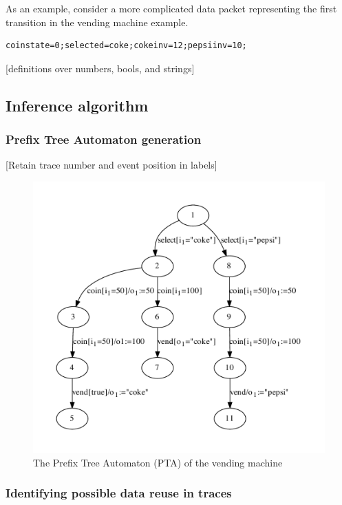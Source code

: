 As an example, consider a more complicated data packet representing the first transition in the vending machine example.

\begin{verbatim}
coinstate=0;selected=coke;cokeinv=12;pepsiinv=10;
\end{verbatim}

[definitions over numbers, bools, and strings]

\subsection{Inference algorithm}
\label{Algorithm}

\subsubsection{Prefix Tree Automaton generation}
\label{PTA}

[Retain trace number and event position in labels]

\begin{figure}[here]
\begin{center}
\includegraphics[width=12cm]{vend1.pdf}
\caption{The Prefix Tree Automaton (PTA) of the vending machine}
\label{fig:pta}
\end{center}
\end{figure}

\subsubsection{Identifying possible data reuse in traces}
\label{IntratraceDependencies}

